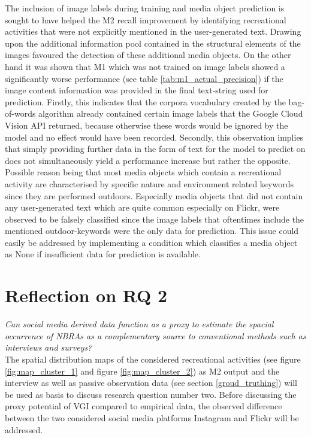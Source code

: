 The inclusion of image labels during training and media object prediction is sought to have helped the M2 recall improvement by identifying recreational activities that were not explicitly mentioned in the user-generated text. Drawing upon the additional information pool contained in the structural elements of the images favoured the detection of these additional media objects. On the other hand it was shown that M1 which was not trained on image labels showed a significantly worse performance (see table \ref{tab:m1_actual_precision}) if the image content information was provided in the final text-string used for prediction. Firstly, this indicates that the corpora vocabulary created by the bag-of-words algorithm already contained certain image labels that the Google Cloud Vision API returned, because otherwise these words would be ignored by the model and no effect would have been recorded. Secondly, this observation implies that simply providing further data in the form of text for the model to predict on does not simultaneously yield a performance increase but rather the opposite. Possible reason being that most media objects which contain a recreational activity are characterised by specific nature and environment related keywords since they are performed outdoors. Especially media objects that did not contain any user-generated text which are quite common especially on Flickr, were observed to be falsely classified since the image labels that oftentimes include the mentioned outdoor-keywords were the only data for prediction. This issue could easily be addressed by implementing a condition which classifies a media object as None if insufficient data for prediction is available. \\

\section{Reflection on RQ 2}\label{discussion_rq2}

\textit{Can social media derived data function as a proxy to estimate the spacial occurrence of NBRAs as a complementary source to conventional methods such as interviews and surveys?} \\

The spatial distribution maps of the considered recreational activities (see figure \ref{fig:map_cluster_1} and figure \ref{fig:map_cluster_2}) as M2 output and the interview as well as passive observation data (see section \ref{groud_truthing}) will be used as basis to discuss research question number two. Before discussing the proxy potential of VGI compared to empirical data, the observed difference between the two considered social media platforms Instagram and Flickr will be addressed.


